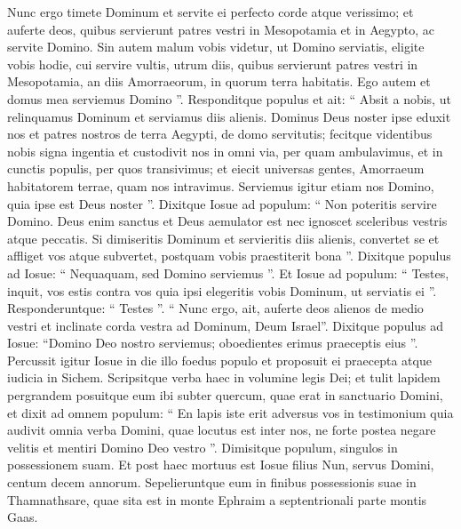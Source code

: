 \begin{biblechapter}
\begin{biblechapter}
\begin{biblechapter}
\begin{biblechapter}
\begin{biblechapter}
\begin{biblechapter}
\begin{biblechapter}
\begin{biblechapter}
\begin{biblechapter}
\begin{biblechapter}
\begin{biblechapter}
\begin{biblechapter}
\begin{biblechapter}
\begin{biblechapter}
\begin{biblechapter}
\begin{biblechapter}
\begin{biblechapter}
\begin{biblechapter}
\begin{biblechapter}
\begin{biblechapter}
\begin{biblechapter}
\begin{biblechapter}
\begin{biblechapter}
\begin{biblechapter}
\verse Nunc ergo timete Dominum et servite ei perfecto corde atque verissimo; et auferte deos, quibus servierunt patres vestri in Mesopotamia et in Aegypto, ac servite Domino. 
\verse Sin autem malum vobis videtur, ut Domino serviatis, eligite vobis hodie, cui servire vultis, utrum diis, quibus servierunt patres vestri in Mesopotamia, an diis Amorraeorum, in quorum terra habitatis. Ego autem et domus mea serviemus Domino ”.
 \verse Responditque populus et ait: “ Absit a nobis, ut relinquamus Dominum et serviamus diis alienis. 
\verse Dominus Deus noster ipse eduxit nos et patres nostros de terra Aegypti, de domo servitutis; fecitque videntibus nobis signa ingentia et custodivit nos in omni via, per quam ambulavimus, et in cunctis populis, per quos transivimus; 
\verse et eiecit universas gentes, Amorraeum habitatorem terrae, quam nos intravimus. Serviemus igitur etiam nos Domino, quia ipse est Deus noster ”.
 \verse Dixitque Iosue ad populum: “ Non poteritis servire Domino. Deus enim sanctus et Deus aemulator est nec ignoscet sceleribus vestris atque peccatis. 
\verse Si dimiseritis Dominum et servieritis diis alienis, convertet se et affliget vos atque subvertet, postquam vobis praestiterit bona ”. 
\verse Dixitque populus ad Iosue: “ Nequaquam, sed Domino serviemus ”. 
\verse Et Iosue ad populum: “ Testes, inquit, vos estis contra vos quia ipsi elegeritis vobis Dominum, ut serviatis ei ”. Responderuntque: “ Testes ”. 
\verse “ Nunc ergo, ait, auferte deos alienos de medio vestri et inclinate corda vestra ad Dominum, Deum Israel”. 
 \verse Dixitque populus ad Iosue: “Domino Deo nostro serviemus; oboedientes erimus praeceptis eius ”.
 \verse Percussit igitur Iosue in die illo foedus populo et proposuit ei praecepta atque iudicia in Sichem. 
\verse Scripsitque verba haec in volumine legis Dei; et tulit lapidem pergrandem posuitque eum ibi subter quercum, quae erat in sanctuario Domini, 
\verse et dixit ad omnem populum: “ En lapis iste erit adversus vos in testimonium quia audivit omnia verba Domini, quae locutus est inter nos, ne forte postea negare velitis et mentiri Domino Deo vestro ”. 
\verse Dimisitque populum, singulos in possessionem suam.
 \verse Et post haec mortuus est Iosue filius Nun, servus Domini, centum decem annorum. 
\verse Sepelieruntque eum in finibus possessionis suae in Thamnathsare, quae sita est in monte Ephraim a septentrionali parte montis Gaas. 

\end{biblechapter}
\end{biblechapter}
\end{biblechapter}
\end{biblechapter}
\end{biblechapter}
\end{biblechapter}
\end{biblechapter}
\end{biblechapter}
\end{biblechapter}
\end{biblechapter}
\end{biblechapter}
\end{biblechapter}
\end{biblechapter}
\end{biblechapter}
\end{biblechapter}
\end{biblechapter}
\end{biblechapter}
\end{biblechapter}
\end{biblechapter}
\end{biblechapter}
\end{biblechapter}
\end{biblechapter}
\end{biblechapter}
\end{biblechapter}
